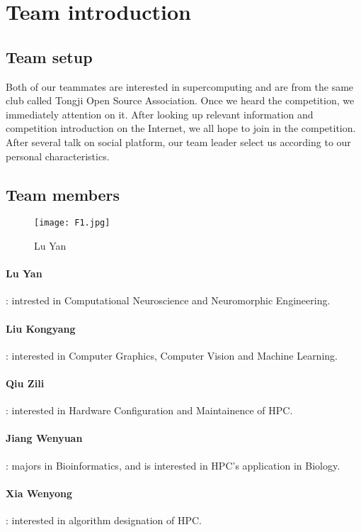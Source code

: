 \documentclass[a4paper, 11pt]{article}
\begin{document}
	\section{Team introduction}
		\subsection{Team setup}
		
			Both of our teammates are interested in supercomputing and are from the same club called Tongji Open Source Association. Once we heard the competition, we immediately attention on it. After looking up relevant information and competition introduction on the Internet, we all hope to join in the competition. After several talk on social platform, our team leader select us according to our personal characteristics.
		
		\subsection{Team members} 
			
			\begin{figure}[H]
				\centering
				\texttt{[image: F1.jpg]}
				\caption{Lu Yan} %
				\label{fig:1}  %
			\end{figure} 
			\paragraph{Lu Yan}: intrested in Computational Neuroscience and Neuromorphic Engineering.
			
			\paragraph{Liu Kongyang}: interested in Computer Graphics, Computer Vision and Machine Learning.
			
			\paragraph{Qiu Zili}: interested in Hardware Configuration and Maintainence of HPC.
			
			\paragraph{Jiang Wenyuan}: majors in Bioinformatics, and is interested in HPC's application in Biology.
			
			\paragraph{Xia Wenyong}: interested in algorithm designation of HPC.
\end{document}
